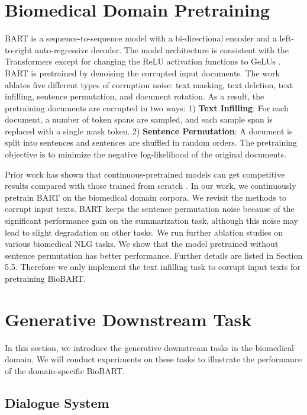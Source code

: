 \documentclass[11pt]{article}
\begin{document}
\section{Biomedical Domain Pretraining}

BART is a sequence-to-sequence model with a bi-directional encoder and a left-to-right auto-regressive decoder. The model architecture is consistent with the Transformers \cite{transformer} except for changing the ReLU activation functions to GeLUs \cite{gelu}. BART is pretrained by denoising the corrupted input documents. The work ablates five different types of corruption noise: text masking, text deletion, text infilling, sentence permutation, and document rotation. As a result, the pretraining documents are corrupted in two ways: 1) \textbf{Text Infilling}: For each document, a number of token spans are sampled, and each sample span is replaced with a single mask token. 2) \textbf{Sentence Permutation}: A document is split into sentences and sentences are shuffled in random orders. The pretraining objective is to minimize the negative log-likelihood of the original documents. 

Prior work has shown that continuous-pretrained models can get competitive results compared with those trained from scratch \cite{pubmedbert}. In our work, we continuously pretrain BART on the biomedical domain corpora. We revisit the methods to corrupt input texts. BART keeps the sentence permutation noise because of the significant performance gain on the summarization task, although this noise may lead to slight degradation on other tasks. We run further ablation studies on various biomedical NLG tasks. We show that the model pretrained without sentence permutation has better performance. Further details are listed in Section 5.5. Therefore we only implement the text infilling task to corrupt input texts for pretraining BioBART. 









\section{Generative Downstream Task}
In this section, we introduce the generative downstream tasks in the biomedical domain. We will conduct experiments on these tasks to illustrate the performance of the domain-specific BioBART. 

\subsection{Dialogue System}
\end{document}
